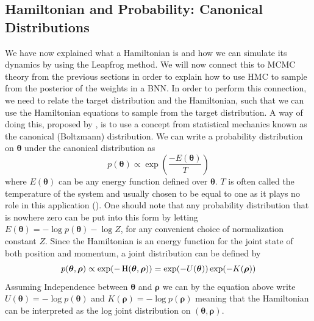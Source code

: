 \subsection{Hamiltonian and Probability: Canonical Distributions}
We have now explained what a Hamiltonian is and how we can simulate its dynamics by using the Leapfrog method. We will now connect this to MCMC theory from the previous sections in order to explain how to use HMC to sample from the posterior of the weights in a BNN. In order to perform this connection, we need to relate the target distribution and the Hamiltonian, such that we can use the Hamiltonian equations to sample from the target distribution. A way of doing this, proposed by \cite{neal2012bayesian}, is to use a concept from statistical mechanics known as the canonical (Boltzmann) distribution. We can write a probability distribution on $\boldsymbol{\theta}$ under the canonical distribution as
\begin{equation*}
    p(\boldsymbol{\theta})\propto \exp\left(\frac{-E(\boldsymbol{\theta})}{T}\right)
\end{equation*}
where $E(\boldsymbol{\theta})$ can be any energy function defined over $\boldsymbol{\theta}$. $T$ is often called the temperature of the system and usually chosen to be equal to one as it plays no role in this application (\cite{neal2012bayesian}).
One should note that any probability distribution that is nowhere zero can be put into this form by letting $E(\boldsymbol{\theta})=-\log p(\boldsymbol{\theta})-\log Z$, for any convenient choice of normalization constant $Z$. Since the Hamiltonian is an energy function for the joint state of both position and momentum, a joint distribution can be defined by
\begin{equation*}
p(\boldsymbol{\theta},\boldsymbol{\rho})\propto \exp(-\operatorname{H}(\boldsymbol{\theta},\boldsymbol{\rho}))   = \exp(-U(\boldsymbol{\theta}))\exp(-K(\boldsymbol{\rho}))
\end{equation*}
Assuming Independence between $\boldsymbol{\theta}$ and $\boldsymbol{\rho}$ we can by the equation above write $U(\boldsymbol{\theta})=-\log p(\boldsymbol{\theta})$ and $K(\boldsymbol{\rho})=-\log p(\boldsymbol{\rho})$ meaning that the Hamiltonian can be interpreted as the log joint distribution on $(\boldsymbol{\theta},\boldsymbol{\rho})$. 
\\
\\
